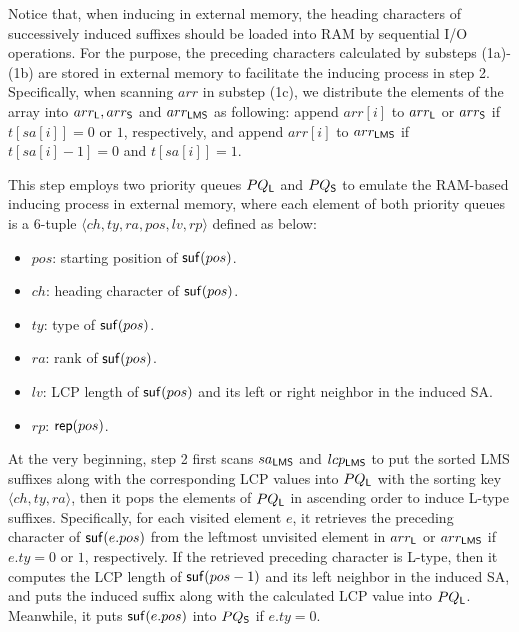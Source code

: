 \documentclass[10pt,journal,compsoc]{IEEEtran}
\begin{document}
	Notice that, when inducing in external memory, the heading characters of successively induced suffixes should be loaded into RAM by sequential I/O operations. For the purpose, the preceding characters calculated by substeps (1a)-(1b) are stored in external memory to facilitate the inducing process in step 2. Specifically, when scanning $arr$ in substep (1c), we distribute the elements of the array into $arr_{\sf L}, arr_{\sf S}$ and $arr_{\sf LMS}$ as following: append $arr[i]$ to $arr_{\sf L}$ or $arr_{\sf S}$ if $t[sa[i]] = 0$ or $1$, respectively, and append $arr[i]$ to $arr_{\sf LMS}$ if $t[sa[i] - 1] = 0$ and $t[sa[i]] = 1$.
	
	\vspace{1ex}  This step employs two priority queues $PQ_{\sf L}$ and $PQ_{\sf S}$ to emulate the RAM-based inducing process in external memory, where each element of both priority queues is a 6-tuple $\langle ch, ty, ra, pos, lv, rp \rangle$ defined as below:
	
	\begin{itemize}
		
		\item $pos$: starting position of ${\sf suf}(pos)$.
		
		\item $ch$: heading character of ${\sf suf}(pos)$.
		
		\item $ty$: type of ${\sf suf}(pos)$.
		
		\item $ra$: rank of ${\sf suf}(pos)$.
		
		\item $lv$: LCP length of ${\sf suf}(pos)$ and its left or right neighbor in the induced SA.
		
		\item $rp$: ${\sf rep}(pos)$.	
	\end{itemize}
	
	At the very beginning, step 2 first scans $sa_{\sf LMS}$ and $lcp_{\sf LMS}$ to put the sorted LMS suffixes along with the corresponding LCP values into $PQ_{\sf L}$ with the sorting key $\langle ch, ty, ra\rangle$, then it pops the elements of $PQ_{\sf L}$ in ascending order to induce L-type suffixes. Specifically, for each visited element $e$, it retrieves the preceding character of ${\sf suf}(e.pos)$ from the leftmost unvisited element in $arr_{\sf L}$ or $arr_{\sf LMS}$ if $e.ty = 0$ or $1$, respectively. If the retrieved preceding character is L-type, then it computes the LCP length of ${\sf suf}(pos - 1)$ and its left neighbor in the induced SA, and puts the induced suffix along with the calculated LCP value into $PQ_{\sf L}$. Meanwhile, it puts ${\sf suf}(e.pos)$ into $PQ_{\sf S}$ if $e.ty = 0$.
	
\end{document}
